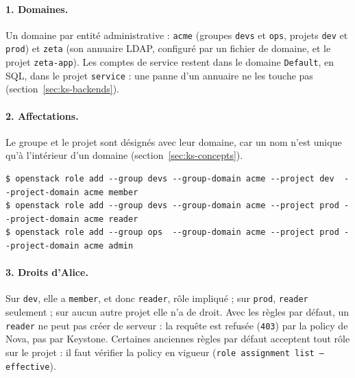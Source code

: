 \begin{correction}
\paragraph{1. Domaines.} Un domaine par entité administrative : \texttt{acme} (groupes \texttt{devs} et \texttt{ops}, projets
\texttt{dev} et \texttt{prod}) et \texttt{zeta} (son annuaire LDAP, configuré par un fichier de domaine, et le projet
\texttt{zeta-app}). Les comptes de service restent dans le domaine \texttt{Default}, en SQL, dans le projet \texttt{service} : une
panne d'un annuaire ne les touche pas (section~\ref{sec:ks-backends}).

\paragraph{2. Affectations.} Le groupe et le projet sont désignés avec leur domaine, car un nom n'est unique qu'à l'intérieur d'un
domaine (section~\ref{sec:ks-concepts}).
\begin{lstlisting}[style=terminal]
$ openstack role add --group devs --group-domain acme --project dev  --project-domain acme member
$ openstack role add --group devs --group-domain acme --project prod --project-domain acme reader
$ openstack role add --group ops  --group-domain acme --project prod --project-domain acme admin
\end{lstlisting}

\paragraph{3. Droits d'Alice.} Sur \texttt{dev}, elle a \texttt{member}, et donc \texttt{reader}, rôle impliqué ; sur \texttt{prod},
\texttt{reader} seulement ; sur aucun autre projet elle n'a de droit. Avec les règles par défaut, un \texttt{reader} ne peut pas créer de
serveur : la requête est refusée (\texttt{403}) par la policy de Nova, pas par Keystone. Certaines anciennes règles par défaut
acceptent tout rôle sur le projet : il faut vérifier la policy en vigueur (\texttt{role assignment list --effective}).
\end{correction}


